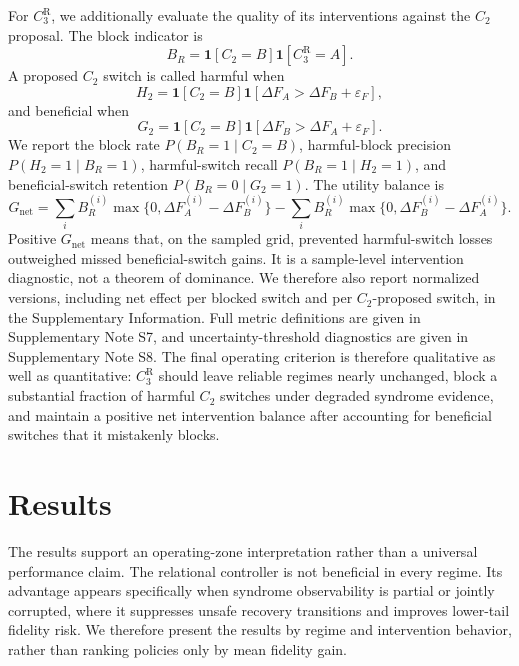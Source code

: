 \documentclass{iopjournal}
\begin{document}
For $C_3^{\mathrm{R}}$, we additionally evaluate the quality of its interventions
against the $C_2$ proposal. The block indicator is
\begin{equation}
B_R=\mathbf{1}[C_2=B]\mathbf{1}[C_3^{\mathrm{R}}=A].
\end{equation}
A proposed $C_2$ switch is called harmful when
\begin{equation}
H_2
=
\mathbf{1}[C_2=B]
\mathbf{1}[\Delta F_A>\Delta F_B+\varepsilon_F],
\end{equation}
and beneficial when
\begin{equation}
G_2
=
\mathbf{1}[C_2=B]
\mathbf{1}[\Delta F_B>\Delta F_A+\varepsilon_F].
\end{equation}
We report the block rate $P(B_R=1\mid C_2=B)$, harmful-block precision
$P(H_2=1\mid B_R=1)$, harmful-switch recall $P(B_R=1\mid H_2=1)$, and
beneficial-switch retention $P(B_R=0\mid G_2=1)$. The utility balance is
\begin{equation}
G_{\mathrm{net}}
=
\sum_i B_R^{(i)}
\max\{0,\Delta F_A^{(i)}-\Delta F_B^{(i)}\}
-
\sum_i B_R^{(i)}
\max\{0,\Delta F_B^{(i)}-\Delta F_A^{(i)}\}.
\end{equation}
Positive $G_{\mathrm{net}}$ means that, on the sampled grid, prevented harmful-switch
losses outweighed missed beneficial-switch gains. It is a sample-level intervention
diagnostic, not a theorem of dominance. We therefore also report normalized
versions, including net effect per blocked switch and per $C_2$-proposed switch,
in the Supplementary Information. Full metric definitions are given in
Supplementary Note S7, and uncertainty-threshold diagnostics are given in
Supplementary Note S8.
The final operating criterion is therefore qualitative as well as quantitative:
$C_3^{\mathrm R}$ should leave reliable regimes nearly unchanged, block a
substantial fraction of harmful $C_2$ switches under degraded syndrome evidence,
and maintain a positive net intervention balance after accounting for beneficial
switches that it mistakenly blocks.

\FloatBarrier

\section{Results}\label{sec:results}

The results support an operating-zone interpretation rather than a universal
performance claim. The relational controller is not beneficial in every regime.
Its advantage appears specifically when syndrome observability is partial or jointly
corrupted, where it suppresses unsafe recovery transitions and improves lower-tail
fidelity risk. We therefore present the results by regime and intervention
behavior, rather than ranking policies only by mean fidelity gain.
\end{document}
